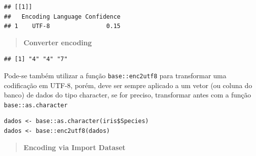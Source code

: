 \documentclass[
]{book}
\newenvironment{Shaded}{\begin{snugshade}}{\end{snugshade}}
\newcommand{\AttributeTok}[1]{\textcolor[rgb]{0.13,0.29,0.53}{#1}}
\newcommand{\CommentTok}[1]{\textcolor[rgb]{0.56,0.35,0.01}{\textit{#1}}}
\newcommand{\DecValTok}[1]{\textcolor[rgb]{0.00,0.00,0.81}{#1}}
\newcommand{\FunctionTok}[1]{\textcolor[rgb]{0.13,0.29,0.53}{\textbf{#1}}}
\newcommand{\NormalTok}[1]{#1}
\newcommand{\SpecialCharTok}[1]{\textcolor[rgb]{0.81,0.36,0.00}{\textbf{#1}}}
\newcommand{\StringTok}[1]{\textcolor[rgb]{0.31,0.60,0.02}{#1}}
\theoremstyle{definition}
\theoremstyle{definition}
\theoremstyle{definition}
\theoremstyle{definition}
\theoremstyle{remark}
\begin{document}
\begin{verbatim}
## [[1]]
##   Encoding Language Confidence
## 1    UTF-8                0.15
\end{verbatim}

\begin{quote}
\textbf{Converter encoding}
\end{quote}

\begin{Shaded}
\end{Shaded}

\begin{verbatim}
## [1] "4" "4" "7"
\end{verbatim}

Pode-se também utilizar a função \texttt{base::enc2utf8} para transformar uma codificação em UTF-8, porém, deve ser sempre aplicado a um vetor (ou coluna do banco) de dados do tipo character, se for preciso, transformar antes com a função \texttt{base::as.character}

\begin{verbatim}
dados <- base::as.character(iris$Species)
dados <- base::enc2utf8(dados)
\end{verbatim}

\begin{quote}
\textbf{Encoding via Import Dataset}
\end{quote}
\end{document}
